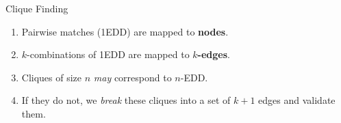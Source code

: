 \documentclass[10pt]{beamer}
\begin{document}
\begin{frame}{Clique Finding}
    \begin{enumerate}
        \item Pairwise matches (1EDD) are mapped to \textbf{nodes}.
        \item $k$-combinations of 1EDD are mapped to \textbf{$k$-edges}.
        \item Cliques of size $n$ \emph{may} correspond to $n$-EDD.
        \item If they do not, we \emph{break} these cliques into a set of $k+1$ edges and
            validate them.
    \end{enumerate}

\end{frame}
\end{document}
